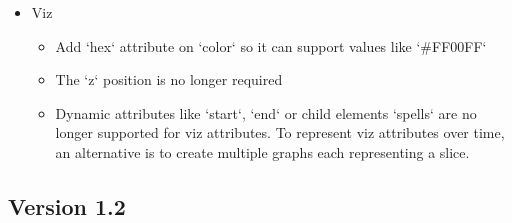 \documentclass[a4paper,10pt]{article}
\begin{document}
\begin{itemize}
\begin{itemize}
\begin{itemize}
\item The optional `mode` attribute on `\<graph\>` now has an additional `slice` value, in addition of `static` and `dynamic`. With slice, the expectation is that the `\<graph\>` also has either a `timestamp` or `start` / `end` intervals.
\item Add a `timestamp` attribute on `\<graph\>` to characterise the slice this graph represent
\item Change the meaning of the `start` and `end` attributes on `\<graph\>` to either characterise the slide instead of the time bounds, which should rather be inferred
\end{itemize}
\end{itemize}
\item Viz
\begin{itemize}
\item Add `hex` attribute on `\<color\>` so it can support values like `#FF00FF`
\item The `z` position is no longer required
\item Dynamic attributes like `start`, `end` or child elements `\<spells\>` are no longer supported for viz attributes. To represent viz attributes over time, an alternative is to create multiple graphs each representing a slice.
\end{itemize}
\end{itemize}

\subsection*{Version 1.2}
\end{document}
